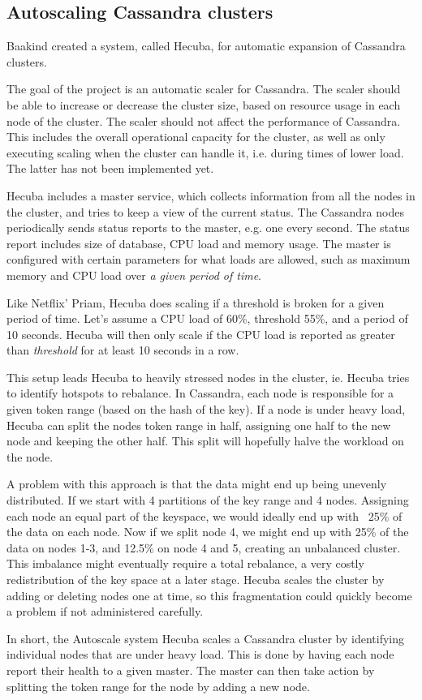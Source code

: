 \subsection{Autoscaling Cassandra clusters}

Baakind\cite{baakind} created a system, called Hecuba, for automatic expansion of Cassandra clusters.

The goal of the project is an automatic scaler for Cassandra. The scaler should be able to increase or decrease the cluster size, based on resource usage in each node of the cluster.
The scaler should not affect the performance of Cassandra. This includes the overall operational capacity for the cluster, as well as only executing scaling when the cluster can handle it, i.e. during times of lower load. The latter has not been implemented yet.

Hecuba includes a master service, which collects information from all the nodes in the cluster, and tries to keep a view of the current status. The Cassandra nodes periodically sends status reports to the master, e.g. one every second. The status report includes size of database, CPU load and memory usage. The master is configured with certain parameters for what loads are allowed, such as maximum memory and CPU load over \emph{a given period of time}.

Like Netflix' Priam, Hecuba does scaling if a threshold is broken for a given period of time. Let's assume a CPU load of 60\%, threshold 55\%, and a period of 10 seconds. Hecuba will then only scale if the CPU load is reported as greater than \emph{threshold} for at least 10 seconds in a row.

This setup leads Hecuba to heavily stressed nodes in the cluster, ie. Hecuba tries to identify hotspots to rebalance. 
In Cassandra, each node is responsible for a given token range (based on the hash of the key). If a node is under heavy load, Hecuba can split the nodes token range in half, assigning one half to the new node and keeping the other half. This split will hopefully halve the workload on the node.

A problem with this approach is that the data might end up being unevenly distributed. If we start with 4 partitions of the key range and 4 nodes. Assigning each node an equal part of the keyspace, we would ideally end up with ~25\% of the data on each node. Now if we split node 4, we might end up with 25\% of the data on nodes 1-3, and 12.5\% on node 4 and 5, creating an unbalanced cluster. This imbalance might eventually require a total rebalance, a very costly redistribution of the key space at a later stage. Hecuba scales the cluster by adding or deleting nodes one at time, so this fragmentation could quickly become a problem if not administered carefully.

In short, the Autoscale system Hecuba scales a Cassandra cluster by identifying individual nodes that are under heavy load. This is done by having each node report their health to a given master. The master can then take action by splitting the token range for the node by adding a new node.




